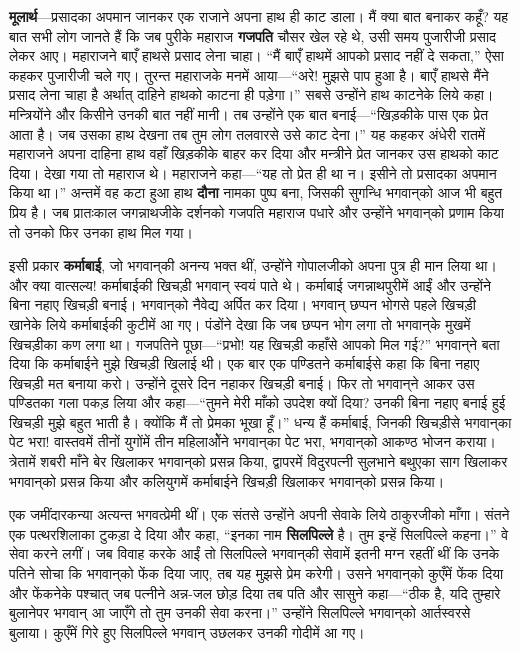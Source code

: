 \begin{sloppypar}\justifying{}
\textbf{मूलार्थ}—प्रसादका अपमान जानकर एक राजाने अपना हाथ ही काट डाला। मैं क्या बात बनाकर कहूँ? यह बात सभी लोग जानते हैं कि जब पुरीके महाराज \textbf{गजपति} चौसर खेल रहे थे, उसी समय पुजारीजी प्रसाद लेकर आए। महाराजने बाएँ हाथसे प्रसाद लेना चाहा। “मैं बाएँ हाथमें आपको प्रसाद नहीं दे सकता,” ऐसा कहकर पुजारीजी चले गए। तुरन्त महाराजके मनमें आया—“अरे! मुझसे पाप हुआ है। बाएँ हाथसे मैंने प्रसाद लेना चाहा है अर्थात् दाहिने हाथको काटना ही पड़ेगा।” सबसे उन्होंने हाथ काटनेके लिये कहा। मन्त्रियोंने और किसीने उनकी बात नहीं मानी। तब उन्होंने एक बात बनाई—“खिड़कीके पास एक प्रेत आता है। जब उसका हाथ देखना तब तुम लोग तलवारसे उसे काट देना।” यह कहकर अंधेरी रातमें महाराजने अपना दाहिना हाथ वहाँ खिड़कीके बाहर कर दिया और मन्त्रीने प्रेत जानकर उस हाथको काट दिया। देखा गया तो महाराज थे। महाराजने कहा—“यह तो प्रेत ही था न। इसीने तो प्रसादका अपमान किया था।” अन्तमें वह कटा हुआ हाथ \textbf{दौना} नामका पुष्प बना, जिसकी सुगन्धि भगवान्‌को आज भी बहुत प्रिय है। जब प्रातःकाल जगन्नाथजीके दर्शनको गजपति महाराज पधारे और उन्होंने भगवान्‌को प्रणाम किया तो उनको फिर उनका हाथ मिल गया।
\end{sloppypar}
\begin{sloppypar}\justifying{}
इसी प्रकार \textbf{कर्माबाई}, जो भगवान्‌की अनन्य भक्त थीं, उन्होंने गोपालजीको अपना पुत्र ही मान लिया था। और क्या वात्सल्य! कर्माबाईकी खिचड़ी भगवान् स्वयं पाते थे। कर्माबाई जगन्नाथ\-पुरीमें आईं और उन्होंने बिना नहाए खिचड़ी बनाई। भगवान्‌को नैवेद्य अर्पित कर दिया। भगवान् छप्पन भोगसे पहले खिचड़ी खानेके लिये कर्माबाईकी कुटीमें आ गए। पंडोंने देखा कि जब छप्पन भोग लगा तो भगवान्‌के मुखमें खिचड़ीका कण लगा था। गजपतिने पूछा—“प्रभो! यह खिचड़ी कहाँसे आपको मिल गई?” भगवान्‌ने बता दिया कि कर्माबाईने मुझे खिचड़ी खिलाई थी। एक बार एक पण्डितने कर्माबाईसे कहा कि बिना नहाए खिचड़ी मत बनाया करो। उन्होंने दूसरे दिन नहाकर खिचड़ी बनाई। फिर तो भगवान्‌ने आकर उस पण्डितका गला पकड़ लिया और कहा—“तुमने मेरी माँको उपदेश क्यों दिया? उनकी बिना नहाए बनाई हुई खिचड़ी मुझे बहुत भाती है। क्योंकि मैं तो प्रेमका भूखा हूँ।” धन्य हैं कर्माबाई, जिनकी खिचड़ीसे भगवान्‌का पेट भरा! वास्तवमें तीनों युगोंमें तीन महिलाओेंने भगवान्‌का पेट भरा, भगवान्‌को आकण्ठ भोजन कराया। त्रेतामें शबरी माँने बेर खिलाकर भगवान्‌को प्रसन्न किया, द्वापरमें विदुरपत्नी सुलभाने बथुएका साग खिलाकर भगवान्‌को प्रसन्न किया और कलियुगमें कर्माबाईने खिचड़ी खिलाकर भगवान्‌को प्रसन्न किया।
\end{sloppypar}
\begin{sloppypar}\justifying{}
एक जमींदार\-कन्या अत्यन्त भगवत्प्रेमी थीं। एक संतसे उन्होंने अपनी सेवाके लिये ठाकुरजीको माँगा। संतने एक पत्थर\-शिलाका टुकड़ा दे दिया और कहा, “इनका नाम \textbf{सिलपिल्ले} है। तुम इन्हें सिलपिल्ले कहना।” वे सेवा करने लगीं। जब विवाह करके आईं तो सिलपिल्ले भगवान्‌की सेवामें इतनी मग्न रहतीं थीं कि उनके पतिने सोचा कि भगवान्‌को फेंक दिया जाए, तब यह मुझसे प्रेम करेगी। उसने भगवान्‌को कुएँमें फेंक दिया और फेंकनेके पश्चात् जब पत्नीने अन्न-जल छोड़ दिया तब पति और सासुने कहा—“ठीक है, यदि तुम्हारे बुलानेपर भगवान् आ जाएँगे तो तुम उनकी सेवा करना।” उन्होंने सिलपिल्ले भगवान्‌को आर्तस्वरसे बुलाया। कुएँमें गिरे हुए सिलपिल्ले भगवान् उछलकर उनकी गोदीमें आ गए।
\end{sloppypar}
